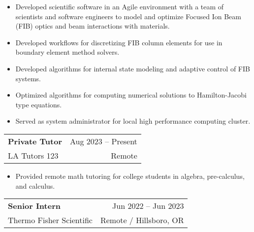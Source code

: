 \documentclass[letterpaper,10.8pt]{article}
\makeatletter
\newcommand{\resumeSubheading}[4]{
  \vspace{-1pt} \item
    \begin{tabular*}{0.97\textwidth}{l@{\extracolsep{\fill}}r}
      \textbf{#1} & #2 \\
      #3  &  #4 \\
    \end{tabular*}\vspace{-5pt}
}
\makeatother
\begin{document}
    \begin{itemize}[leftmargin=*,label={$\diamond$}]
    \itemsep0em %
    
    	\item {Developed scientific software in an Agile environment with a team of scientists and software engineers to model and optimize Focused Ion Beam (FIB) optics and beam interactions with materials.}
	
	\item {Developed workflows for discretizing FIB column elements for use in boundary element method solvers.}
	
	\item {Developed algorithms for internal state modeling and adaptive control of FIB systems.}
	
	\item {Optimized algorithms for computing numerical solutions to Hamilton-Jacobi type equations.}
	
	\item {Served as system administrator for local high performance computing cluster.}
	
	\end{itemize} %
  
   \resumeSubheading
    {Private Tutor}{Aug 2023 – Present}{LA Tutors 123}{Remote}
    
    \begin{itemize}[leftmargin=*,label={$\diamond$}]
    \itemsep0em %
    
    	\item {Provided remote math tutoring for college students in algebra, pre-calculus, and calculus.}
	
	\end{itemize} %
  
    \resumeSubheading
    {Senior Intern}{Jun 2022 – Jun 2023}{Thermo Fisher Scientific}{Remote / Hillsboro, OR}
    
\end{document}
